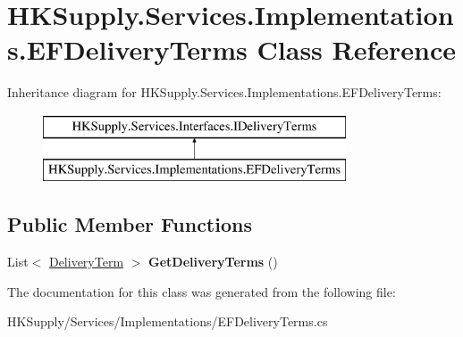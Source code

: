 \hypertarget{class_h_k_supply_1_1_services_1_1_implementations_1_1_e_f_delivery_terms}{}\section{H\+K\+Supply.\+Services.\+Implementations.\+E\+F\+Delivery\+Terms Class Reference}
\label{class_h_k_supply_1_1_services_1_1_implementations_1_1_e_f_delivery_terms}
Inheritance diagram for H\+K\+Supply.\+Services.\+Implementations.\+E\+F\+Delivery\+Terms\+:\begin{figure}[H]
\begin{center}
\leavevmode
\includegraphics[height=2.000000cm]{class_h_k_supply_1_1_services_1_1_implementations_1_1_e_f_delivery_terms}
\end{center}
\end{figure}
\subsection*{Public Member Functions}
\begin{DoxyCompactItemize}
\item 
\mbox{\label{class_h_k_supply_1_1_services_1_1_implementations_1_1_e_f_delivery_terms_a8c1b9f2f41db6e5f61c20bb93a2d99f0}} 
List$<$ \mbox{\hyperlink{class_h_k_supply_1_1_models_1_1_delivery_term}{Delivery\+Term}} $>$ {\bfseries Get\+Delivery\+Terms} ()
\end{DoxyCompactItemize}


The documentation for this class was generated from the following file\+:\begin{DoxyCompactItemize}
\item 
H\+K\+Supply/\+Services/\+Implementations/E\+F\+Delivery\+Terms.\+cs\end{DoxyCompactItemize}
